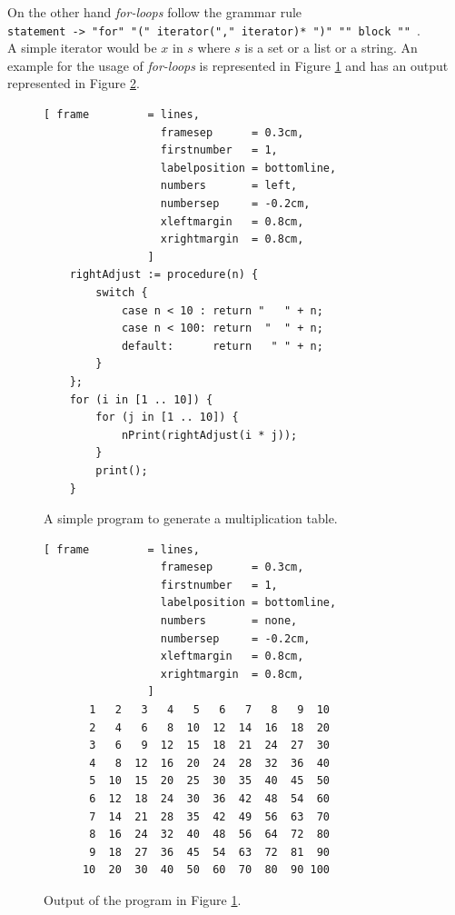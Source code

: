 \documentclass[11pt]{report}
\begin{document}
On the other hand \textsl{for-loops} follow the grammar rule
\\[0.2cm]
\hspace*{1.3cm}
\texttt{statement -> "for" "(" iterator("," iterator)* ")" "{" block "}" }.
\\[0.2cm]
A simple iterator would be $x$ in $s$ where $s$ is a set or a list or a string. An example for the usage of \textsl{for-loops} is represented in Figure \ref{fig:multiplication-table.stlx} and has an output represented in Figure \ref{fig:multiplication-table}.
\begin{figure}[!ht]
\centering
\begin{Verbatim}[ frame         = lines, 
                  framesep      = 0.3cm, 
                  firstnumber   = 1,
                  labelposition = bottomline,
                  numbers       = left,
                  numbersep     = -0.2cm,
                  xleftmargin   = 0.8cm,
                  xrightmargin  = 0.8cm,
                ]
    rightAdjust := procedure(n) {
        switch {
            case n < 10 : return "   " + n;
            case n < 100: return  "  " + n;
            default:      return   " " + n;
        }
    };      
    for (i in [1 .. 10]) {
        for (j in [1 .. 10]) {
            nPrint(rightAdjust(i * j));
        }
        print();
    }
\end{Verbatim}
\vspace*{-0.3cm}
\caption{A simple program to generate a multiplication table.}
\label{fig:multiplication-table.stlx}
\end{figure}

\begin{figure}[!ht]
\centering
\begin{Verbatim}[ frame         = lines, 
                  framesep      = 0.3cm, 
                  firstnumber   = 1,
                  labelposition = bottomline,
                  numbers       = none,
                  numbersep     = -0.2cm,
                  xleftmargin   = 0.8cm,
                  xrightmargin  = 0.8cm,
                ]
       1   2   3   4   5   6   7   8   9  10
       2   4   6   8  10  12  14  16  18  20
       3   6   9  12  15  18  21  24  27  30
       4   8  12  16  20  24  28  32  36  40
       5  10  15  20  25  30  35  40  45  50
       6  12  18  24  30  36  42  48  54  60
       7  14  21  28  35  42  49  56  63  70
       8  16  24  32  40  48  56  64  72  80
       9  18  27  36  45  54  63  72  81  90
      10  20  30  40  50  60  70  80  90 100
\end{Verbatim}
\vspace*{-0.3cm}
\caption{Output of the program in Figure \ref{fig:multiplication-table.stlx}.}
\label{fig:multiplication-table}
\end{figure}
\pagebreak
\end{document}
